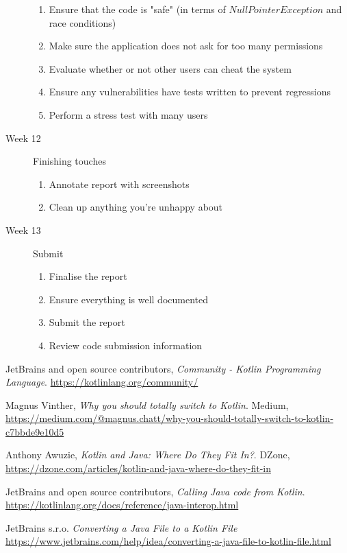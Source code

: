 \documentclass[a4paper]{article}
\begin{document}
\begin{description}
\begin{enumerate}
            \item Ensure that the code is "safe" (in terms of $NullPointerException$ and race conditions)
            \item Make sure the application does not ask for too many permissions
            \item Evaluate whether or not other users can cheat the system
            \item Ensure any vulnerabilities have tests written to prevent regressions
            \item Perform a stress test with many users
        \end{enumerate}
    \item[Week 12] Finishing touches
        \begin{enumerate}
            \item Annotate report with screenshots
            \item Clean up anything you're unhappy about
        \end{enumerate}
    \item[Week 13] Submit
        \begin{enumerate}
            \item Finalise the report
            \item Ensure everything is well documented
            \item Submit the report
            \item Review code submission information
        \end{enumerate}
\end{description}
\pagebreak

\begin{thebibliography}{999}
\raggedright

    JetBrains and open source contributors,
    \emph{Community - Kotlin Programming Language}.
    \url{https://kotlinlang.org/community/}

    Magnus Vinther,
    \emph{Why you should totally switch to Kotlin}. Medium,
    \url{https://medium.com/@magnus.chatt/why-you-should-totally-switch-to-kotlin-c7bbde9e10d5}

    Anthony Awuzie,
    \emph{Kotlin and Java: Where Do They Fit In?}. DZone,
    \url{https://dzone.com/articles/kotlin-and-java-where-do-they-fit-in}

    JetBrains and open source contributors,
    \emph{Calling Java code from Kotlin}.
    \url{https://kotlinlang.org/docs/reference/java-interop.html}

    JetBrains s.r.o.
    \emph{Converting a Java File to a Kotlin File}
    \url{https://www.jetbrains.com/help/idea/converting-a-java-file-to-kotlin-file.html}

\end{thebibliography}
\end{document}

